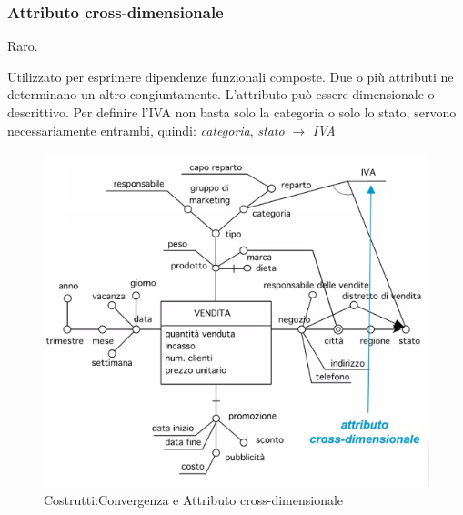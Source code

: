 \subsubsection{Attributo cross-dimensionale}
\begin{info}
	Raro.
\end{info}
Utilizzato per esprimere dipendenze funzionali composte. Due o più attributi ne determinano un altro congiuntamente. L'attributo può essere dimensionale o descrittivo. Per definire l'IVA non basta solo la categoria o solo lo stato, servono necessariamente entrambi, quindi:\newline
\textit{categoria}, \textit{stato}  $\xrightarrow[]{}$ \textit{IVA}
\begin{figure}[H]
	\begin{center}
		\includegraphics[width=0.7\linewidth]{img/crossdiv.png}
		\caption{Costrutti:Convergenza e Attributo cross-dimensionale}
	\end{center}
\end{figure}
